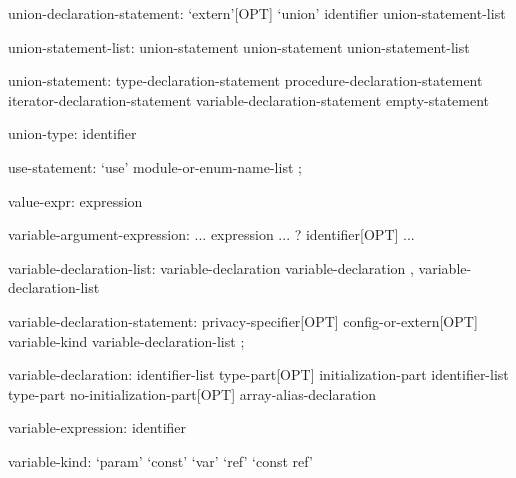 \begin{syntax}
union-declaration-statement:
  `extern'[OPT] `union' identifier { union-statement-list }
\end{syntax}

\begin{syntax}
union-statement-list:
  union-statement
  union-statement union-statement-list
\end{syntax}

\begin{syntax}
union-statement:
  type-declaration-statement
  procedure-declaration-statement
  iterator-declaration-statement
  variable-declaration-statement
  empty-statement
\end{syntax}

\begin{syntax}
union-type:
  identifier
\end{syntax}

\begin{syntax}
use-statement:
  `use' module-or-enum-name-list ;
\end{syntax}

\begin{syntax}
value-expr:
  expression
\end{syntax}

\begin{syntax}
variable-argument-expression:
  ... expression
  ... ? identifier[OPT]
  ...
\end{syntax}

\begin{syntax}
variable-declaration-list:
  variable-declaration
  variable-declaration , variable-declaration-list
\end{syntax}

\begin{syntax}
variable-declaration-statement:
  privacy-specifier[OPT] config-or-extern[OPT] variable-kind variable-declaration-list ;
\end{syntax}

\begin{syntax}
variable-declaration:
  identifier-list type-part[OPT] initialization-part
  identifier-list type-part no-initialization-part[OPT]
  array-alias-declaration
\end{syntax}

\begin{syntax}
variable-expression:
  identifier
\end{syntax}

\begin{syntax}
variable-kind:
  `param'
  `const'
  `var'
  `ref'
  `const ref'
\end{syntax}

